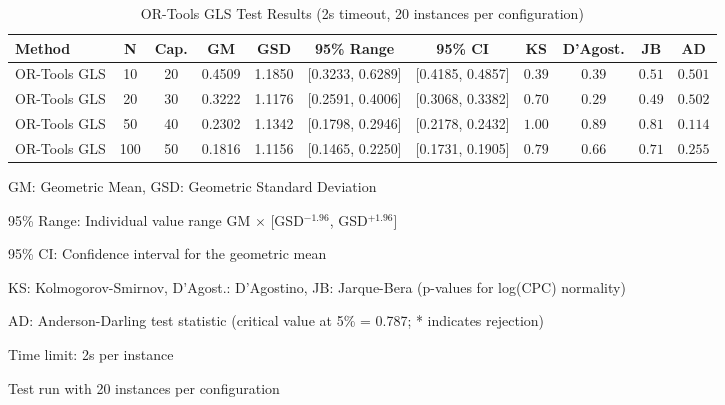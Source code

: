 
\begin{table*}[htbp]
\centering
\caption{OR-Tools GLS Test Results (2s timeout, 20 instances per configuration)}
\label{tab:ortools-gls-2s}
\begin{tabular}{@{}l c c S[table-format=1.4] S[table-format=1.4] c c c c c c@{}}
\toprule
\textbf{Method} & \textbf{N} & \textbf{Cap.} & {\textbf{GM}} & {\textbf{GSD}} & 
\textbf{95\% Range} & \textbf{95\% CI} & \textbf{KS} & \textbf{D'Agost.} & \textbf{JB} & \textbf{AD} \\
\midrule
OR-Tools GLS & 10 & 20 & 0.4509 & 1.1850 & [0.3233, 0.6289] & [0.4185, 0.4857] & $0.39$ & $0.39$ & $0.51$ & $0.501$ \\
OR-Tools GLS & 20 & 30 & 0.3222 & 1.1176 & [0.2591, 0.4006] & [0.3068, 0.3382] & $0.70$ & $0.29$ & $0.49$ & $0.502$ \\
OR-Tools GLS & 50 & 40 & 0.2302 & 1.1342 & [0.1798, 0.2946] & [0.2178, 0.2432] & $1.00$ & $0.89$ & $0.81$ & $0.114$ \\
OR-Tools GLS & 100 & 50 & 0.1816 & 1.1156 & [0.1465, 0.2250] & [0.1731, 0.1905] & $0.79$ & $0.66$ & $0.71$ & $0.255$ \\
\bottomrule
\end{tabular}
\begin{tablenotes}
\small
\item GM: Geometric Mean, GSD: Geometric Standard Deviation
\item 95\% Range: Individual value range GM $\times$ [GSD$^{-1.96}$, GSD$^{+1.96}$]
\item 95\% CI: Confidence interval for the geometric mean
\item KS: Kolmogorov-Smirnov, D'Agost.: D'Agostino, JB: Jarque-Bera (p-values for log(CPC) normality)
\item AD: Anderson-Darling test statistic (critical value at 5\% = 0.787; * indicates rejection)
\item Time limit: 2s per instance
\item Test run with 20 instances per configuration
\end{tablenotes}
\end{table*}

